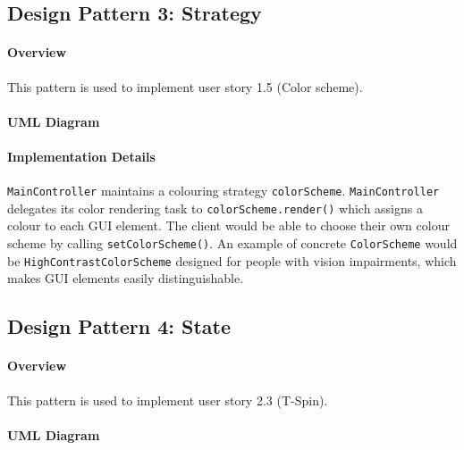 \documentclass{article}
\begin{document}
\clearpage

\subsection{Design Pattern 3: Strategy}

\paragraph{Overview}
This pattern is used to implement user story 1.5 (Color scheme).

\paragraph{UML Diagram}\hfill

\begin{figure}[H]
    
\end{figure}

\paragraph{Implementation Details}

\verb`MainController` maintains a colouring strategy \verb`colorScheme`. \verb`MainController` delegates its color rendering task to \verb`colorScheme.render()` which assigns a colour to each GUI element. The client would be able to choose their own colour scheme by calling \verb|setColorScheme()|. An example of concrete \verb|ColorScheme| would be \verb`HighContrastColorScheme` designed for people with vision impairments, which makes GUI elements easily distinguishable.

\clearpage

\subsection{Design Pattern 4: State}

\paragraph{Overview}
This pattern is used to implement user story 2.3 (T-Spin).

\paragraph{UML Diagram}\hfill

\begin{figure}[H]
    
\end{figure}
\end{document}
